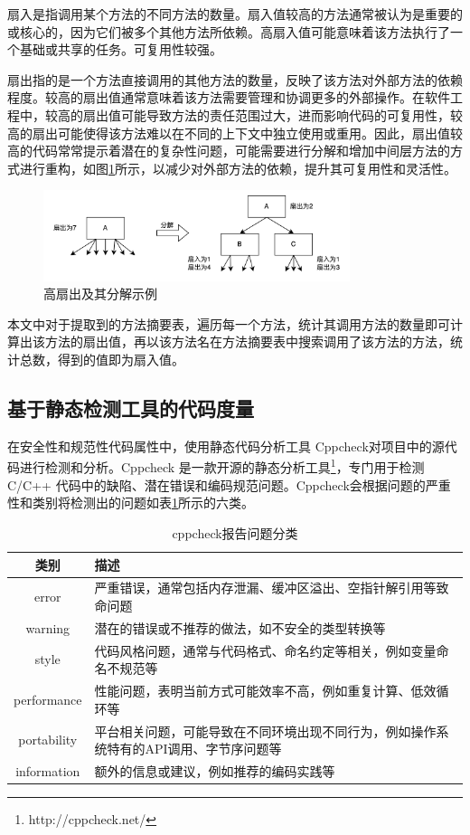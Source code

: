 扇入是指调用某个方法的不同方法的数量。扇入值较高的方法通常被认为是重要的或核心的，因为它们被多个其他方法所依赖。高扇入值可能意味着该方法执行了一个基础或共享的任务。可复用性较强。

扇出指的是一个方法直接调用的其他方法的数量，反映了该方法对外部方法的依赖程度。较高的扇出值通常意味着该方法需要管理和协调更多的外部操作。在软件工程中，较高的扇出值可能导致方法的责任范围过大，进而影响代码的可复用性，较高的扇出可能使得该方法难以在不同的上下文中独立使用或重用。因此，扇出值较高的代码常常提示着潜在的复杂性问题，可能需要进行分解和增加中间层方法的方式进行重构，如图\ref{4_高扇出及其分解示例}所示，以减少对外部方法的依赖，提升其可复用性和灵活性。

\begin{figure}[h]
\centering
\includegraphics[width = 0.8\textwidth]{figures/扇出介绍.jpg}
\caption{高扇出及其分解示例}
\label{4_高扇出及其分解示例}
\end{figure}

本文中对于提取到的方法摘要表，遍历每一个方法，统计其调用方法的数量即可计算出该方法的扇出值，再以该方法名在方法摘要表中搜索调用了该方法的方法，统计总数，得到的值即为扇入值。

\subsection{基于静态检测工具的代码度量}

在安全性和规范性代码属性中，使用静态代码分析工具 Cppcheck对项目中的源代码进行检测和分析。Cppcheck 是一款开源的静态分析工具\footnote{http://cppcheck.net/}，专门用于检测 C/C++ 代码中的缺陷、潜在错误和编码规范问题。Cppcheck会根据问题的严重性和类别将检测出的问题如表\ref{4_cppcheck报告问题分类}所示的六类。

\begin{table}[htbp]
\caption{cppcheck报告问题分类}
\label{4_cppcheck报告问题分类}
\vspace{0.5em}\centering\wuhao
\begin{tabular}{cp{12cm}}
\toprule
类别 & 描述 \\
\midrule
error & 严重错误，通常包括内存泄漏、缓冲区溢出、空指针解引用等致命问题 \\
warning & 潜在的错误或不推荐的做法，如不安全的类型转换等 \\
style & 代码风格问题，通常与代码格式、命名约定等相关，例如变量命名不规范等 \\
performance & 性能问题，表明当前方式可能效率不高，例如重复计算、低效循环等 \\
portability & 平台相关问题，可能导致在不同环境出现不同行为，例如操作系统特有的API调用、字节序问题等 \\
information & 额外的信息或建议，例如推荐的编码实践等 \\
\bottomrule
\end{tabular}
\end{table}


